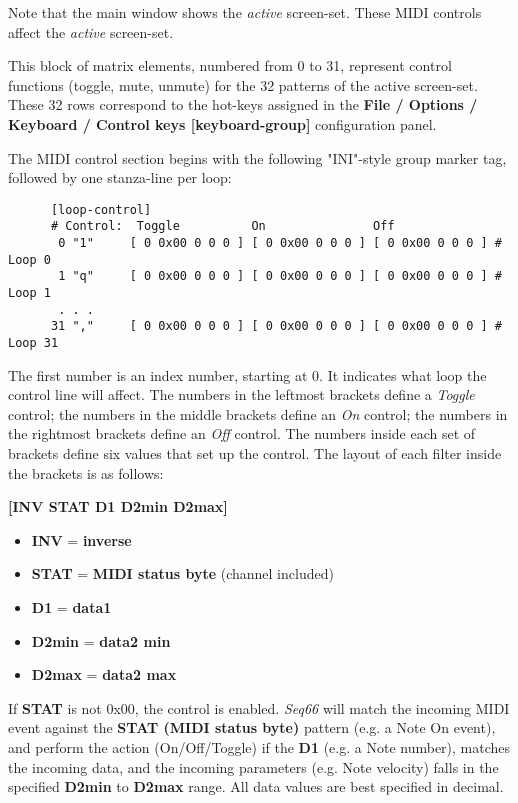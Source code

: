    Note that the main window shows the \textsl{active} screen-set.
   These MIDI controls affect the \textsl{active} screen-set.

   This block of matrix elements, numbered from 0 to 31,
   represent control functions (toggle, mute, unmute) for the 32 patterns
   of the active screen-set.
   These 32 rows correspond to the hot-keys assigned in
   the \textbf{File / Options / Keyboard / Control keys [keyboard-group]} 
   configuration panel.

   The MIDI control section begins with the following "INI"-style
   group marker tag, followed by one stanza-line per loop:

   \begin{verbatim}
      [loop-control]
      # Control:  Toggle          On               Off
       0 "1"     [ 0 0x00 0 0 0 ] [ 0 0x00 0 0 0 ] [ 0 0x00 0 0 0 ] # Loop 0
       1 "q"     [ 0 0x00 0 0 0 ] [ 0 0x00 0 0 0 ] [ 0 0x00 0 0 0 ] # Loop 1
       . . .
      31 ","     [ 0 0x00 0 0 0 ] [ 0 0x00 0 0 0 ] [ 0 0x00 0 0 0 ] # Loop 31
   \end{verbatim}

   The first number is an index number, starting at 0.  It indicates what
   loop the control line will affect.
   The numbers in the leftmost brackets define a \textsl{Toggle} control;
   the numbers in the middle brackets define an \textsl{On} control;
   the numbers in the rightmost brackets define an \textsl{Off} control.
   The numbers inside each set of brackets define six values that set up the
   control.  The layout of each filter inside the brackets is as follows:

      \textbf{[INV STAT D1 D2min D2max]}

   \begin{itemize}
      \item \textbf{INV} = \textbf{inverse}
      \item \textbf{STAT} = \textbf{MIDI status byte} (channel included) 
      \item \textbf{D1} = \textbf{data1}
      \item \textbf{D2min} = \textbf{data2 min}
      \item \textbf{D2max} = \textbf{data2 max}
   \end{itemize}

   If \textbf{STAT} is not 0x00, the control is enabled.  \textsl{Seq66} will
   match the incoming MIDI event against the \textbf{STAT (MIDI status byte)}
   pattern (e.g. a Note On event), and perform the action (On/Off/Toggle) if
   the \textbf{D1} (e.g. a Note number), matches the incoming data, and the
   incoming parameters (e.g. Note velocity) falls in the specified
   \textbf{D2min} to \textbf{D2max} range.  All data values are best specified
   in decimal.

